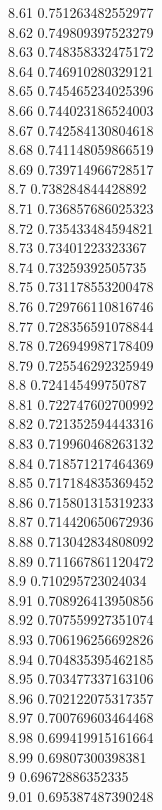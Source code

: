 {8.61	0.751263482552977\\
8.62	0.749809397523279\\
8.63	0.748358332475172\\
8.64	0.746910280329121\\
8.65	0.745465234025396\\
8.66	0.744023186524003\\
8.67	0.742584130804618\\
8.68	0.741148059866519\\
8.69	0.739714966728517\\
8.7	0.738284844428892\\
8.71	0.736857686025323\\
8.72	0.735433484594821\\
8.73	0.73401223323367\\
8.74	0.73259392505735\\
8.75	0.731178553200478\\
8.76	0.729766110816746\\
8.77	0.728356591078844\\
8.78	0.726949987178409\\
8.79	0.725546292325949\\
8.8	0.724145499750787\\
8.81	0.722747602700992\\
8.82	0.721352594443316\\
8.83	0.719960468263132\\
8.84	0.718571217464369\\
8.85	0.717184835369452\\
8.86	0.715801315319233\\
8.87	0.714420650672936\\
8.88	0.713042834808092\\
8.89	0.711667861120472\\
8.9	0.710295723024034\\
8.91	0.708926413950856\\
8.92	0.707559927351074\\
8.93	0.706196256692826\\
8.94	0.704835395462185\\
8.95	0.703477337163106\\
8.96	0.702122075317357\\
8.97	0.700769603464468\\
8.98	0.699419915161664\\
8.99	0.69807300398381\\
9	0.69672886352335\\
9.01	0.695387487390248\\
}
